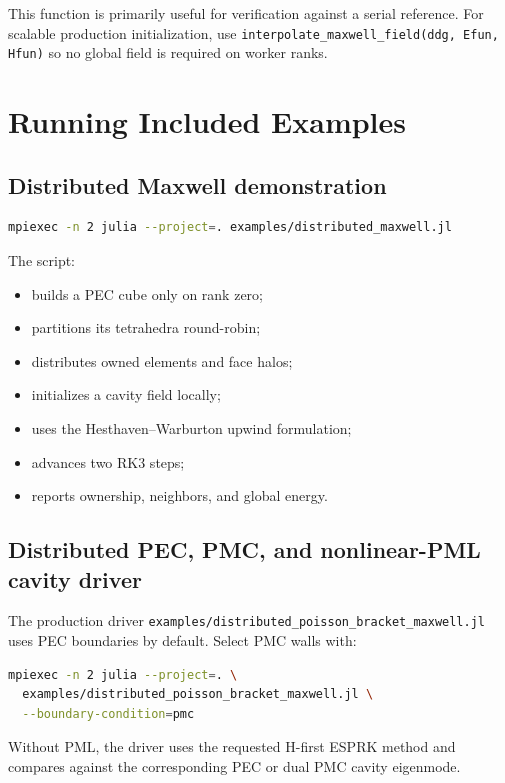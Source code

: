 \documentclass[11pt,oneside]{book}
\newcommand{\code}[1]{\texttt{#1}}
\begin{document}
This function is primarily useful for verification against a serial reference.
For scalable production initialization, use
\code{interpolate\_maxwell\_field(ddg, Efun, Hfun)} so no global field is
required on worker ranks.

\chapter{Running Included Examples}

\section{Distributed Maxwell demonstration}

\begin{lstlisting}[language=bash]
mpiexec -n 2 julia --project=. examples/distributed_maxwell.jl
\end{lstlisting}

The script:
\begin{itemize}[leftmargin=*]
  \item builds a PEC cube only on rank zero;
  \item partitions its tetrahedra round-robin;
  \item distributes owned elements and face halos;
  \item initializes a cavity field locally;
  \item uses the Hesthaven--Warburton upwind formulation;
  \item advances two RK3 steps;
  \item reports ownership, neighbors, and global energy.
\end{itemize}

\section{Distributed PEC, PMC, and nonlinear-PML cavity driver}

The production driver
\code{examples/distributed\_poisson\_bracket\_maxwell.jl} uses PEC boundaries
by default. Select PMC walls with:
\begin{lstlisting}[language=bash]
mpiexec -n 2 julia --project=. \
  examples/distributed_poisson_bracket_maxwell.jl \
  --boundary-condition=pmc
\end{lstlisting}
Without PML, the driver uses the requested H-first ESPRK method and compares
against the corresponding PEC or dual PMC cavity eigenmode.
\end{document}
